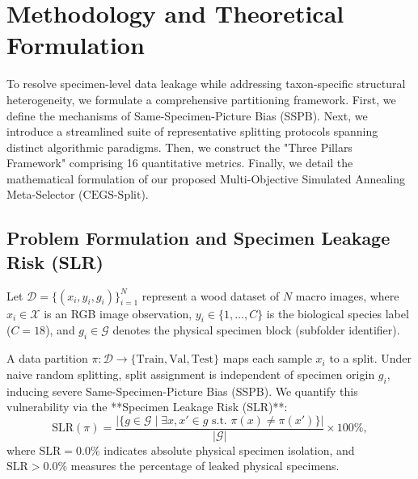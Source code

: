 \section{Methodology and Theoretical Formulation}

To resolve specimen-level data leakage while addressing taxon-specific structural heterogeneity, we formulate a comprehensive partitioning framework. First, we define the mechanisms of Same-Specimen-Picture Bias (SSPB). Next, we introduce a streamlined suite of representative splitting protocols spanning distinct algorithmic paradigms. Then, we construct the "Three Pillars Framework" comprising 16 quantitative metrics. Finally, we detail the mathematical formulation of our proposed Multi-Objective Simulated Annealing Meta-Selector ($\text{CEGS-Split}$).

\subsection{Problem Formulation and Specimen Leakage Risk (SLR)}
Let $\mathcal{D} = \{(x_i, y_i, g_i)\}_{i=1}^N$ represent a wood dataset of $N$ macro images, where $x_i \in \mathcal{X}$ is an RGB image observation, $y_i \in \{1, \dots, C\}$ is the biological species label ($C=18$), and $g_i \in \mathcal{G}$ denotes the physical specimen block (subfolder identifier).

A data partition $\pi: \mathcal{D} \to \{\text{Train}, \text{Val}, \text{Test}\}$ maps each sample $x_i$ to a split. Under naive random splitting, split assignment is independent of specimen origin $g_i$, inducing severe Same-Specimen-Picture Bias (SSPB). We quantify this vulnerability via the **Specimen Leakage Risk (SLR)**:
\begin{equation}
\mathrm{SLR}(\pi) = \frac{|\{g \in \mathcal{G} \mid \exists x, x' \in g \text{ s.t. } \pi(x) \neq \pi(x')\}|}{|\mathcal{G}|} \times 100\%,
\end{equation}
where $\mathrm{SLR} = 0.0\%$ indicates absolute physical specimen isolation, and $\mathrm{SLR} > 0.0\%$ measures the percentage of leaked physical specimens.

